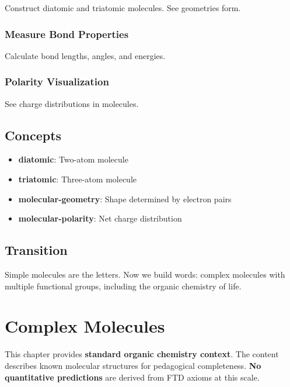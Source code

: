 \documentclass[
  11pt,
  letterpaper,
  twoside,
  openright]{book}
\providecommand{\tightlist}{%
  \setlength{\itemsep}{0pt}\setlength{\parskip}{0pt}}
\begin{document}
Construct diatomic and triatomic molecules. See geometries form.

\subsection{Measure Bond Properties}\label{measure-bond-properties}

Calculate bond lengths, angles, and energies.

\subsection{Polarity Visualization}\label{polarity-visualization}

See charge distributions in molecules.

\section{Concepts}\label{concepts-5}

\begin{itemize}
\tightlist
\item
  \textbf{diatomic}: Two-atom molecule
\item
  \textbf{triatomic}: Three-atom molecule
\item
  \textbf{molecular-geometry}: Shape determined by electron pairs
\item
  \textbf{molecular-polarity}: Net charge distribution
\end{itemize}

\section{Transition}\label{transition-5}

Simple molecules are the letters. Now we build words: complex molecules
with multiple functional groups, including the organic chemistry of
life.

\chapter{Complex Molecules}\label{sec-complex-molecules}

\begin{tcolorbox}[enhanced jigsaw, leftrule=.75mm, title=\textcolor{quarto-callout-warning-color}{\faExclamationTriangle}\hspace{0.5em}{Pedagogical Context {[}NOT DERIVED FROM FTD{]}}, bottomrule=.15mm, opacityback=0, coltitle=black, arc=.35mm, colframe=quarto-callout-warning-color-frame, colbacktitle=quarto-callout-warning-color!10!white, colback=white, titlerule=0mm, breakable, bottomtitle=1mm, toptitle=1mm, rightrule=.15mm, toprule=.15mm, left=2mm, opacitybacktitle=0.6]

This chapter provides \textbf{standard organic chemistry context}. The
content describes known molecular structures for pedagogical
completeness. \textbf{No quantitative predictions} are derived from FTD
axioms at this scale.

\end{tcolorbox}
\end{document}
